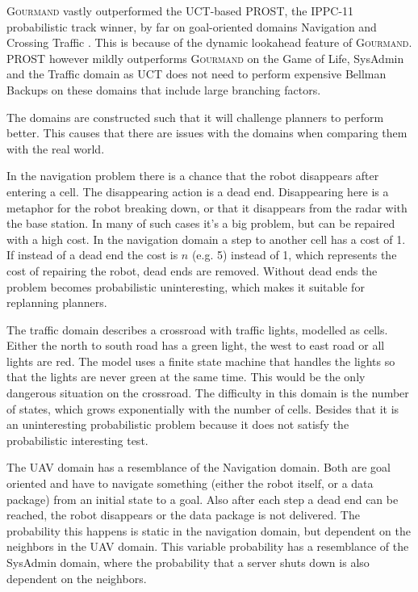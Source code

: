 \documentclass[runningheads,a4paper]{llncs}
\begin{document}
\textsc{Gourmand} vastly outperformed the UCT-based PROST, the IPPC-11
probabilistic track winner, by far on goal-oriented domains Navigation and
Crossing Traffic \cite{kolobov2012gourmand}. This is because of the dynamic
lookahead feature of \textsc{Gourmand}. PROST however mildly outperforms
\textsc{Gourmand} on the Game of Life, SysAdmin and the Traffic domain as UCT
does not need to perform expensive Bellman Backups on these domains that
include large branching factors.

The domains are constructed such that it will challenge planners to perform
better. This causes that there are issues with the domains when comparing them
with the real world.

In the navigation problem there is a chance that the robot
disappears after entering a cell. The disappearing action is a dead end.
Disappearing here is a metaphor for the robot breaking down, or that it
disappears from the radar with the base station. In many of such cases it's a
big problem, but can be repaired with a high cost. In the navigation domain a
step to another cell has a cost of 1. If instead of a dead end the cost is $n$
(e.g. 5) instead of 1, which represents the cost of repairing the robot, dead
ends are removed. Without dead ends the problem becomes probabilistic
uninteresting, which makes it suitable for replanning planners.

The traffic domain describes a crossroad with traffic lights, modelled as
cells. Either the north to south road has a green light, the west to east road
or all lights are red. The model uses a finite state machine that handles the
lights so that the lights are never green at the same time. This would be the
only dangerous situation on the crossroad. The difficulty in this domain is
the number of states, which grows exponentially with the number of cells.
Besides that it is an uninteresting probabilistic problem because it does
not satisfy the probabilistic interesting test.

The UAV domain has a resemblance of the Navigation domain. Both are goal
oriented and have to navigate something (either the robot itself, or a data
package) from an initial state to a goal. Also after each step a dead end can
be reached, the robot disappears or the data package is not delivered.
The probability this happens is static in the navigation domain, but dependent
on the neighbors in the UAV domain. This variable probability has a resemblance
of the SysAdmin domain, where the probability that a server shuts down is also
dependent on the neighbors.
\end{document}
